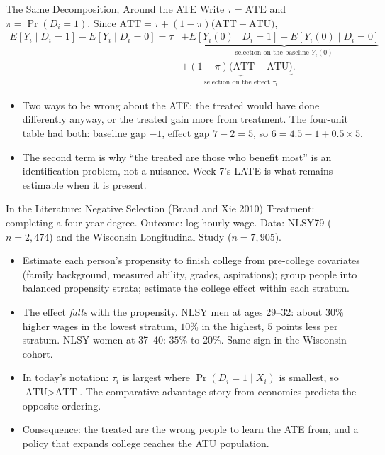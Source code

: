 \documentclass[aspectratio=169,11pt,xcolor=dvipsnames]{beamer}
\newcommand{\srcp}[1]{{\scriptsize\color{gray}(#1)}}
\newcommand{\E}{E}
\begin{document}
\begin{frame}{The Same Decomposition, Around the ATE}
Write $\tau = \text{ATE}$ and $\pi = \Pr(D_i = 1)$. Since
$\text{ATT} = \tau + (1 - \pi)\big(\text{ATT} - \text{ATU}\big)$,
\begin{align*}
  \E[Y_i \mid D_i = 1] - \E[Y_i\mid D_i=0]
 = \tau
  &+ \underbrace{\E[Y_i(0)\mid D_i=1] - \E[Y_i(0)\mid D_i=0]}_{\text{selection on the baseline } Y_i(0)} \\
  &+ \underbrace{(1-\pi)\big(\text{ATT} - \text{ATU}\big)}_{\text{selection on the effect } \tau_i} .
\end{align*}
\begin{itemize}\itemsep3pt
  \item Two ways to be wrong about the ATE: the treated would have done
        differently anyway, or the treated gain more from treatment. The
        four-unit table had both: baseline gap $-1$, effect gap $7 - 2 = 5$,
        so $6 = 4.5 - 1 + 0.5 \times 5$.
  \item The second term is why ``the treated are those who benefit most''
        is an identification problem, not a nuisance. Week 7's LATE is what
        remains estimable when it is present.
\end{itemize}
\end{frame}

\begin{frame}{In the Literature: Negative Selection \srcp{Brand and Xie 2010}}
Treatment: completing a four-year degree. Outcome: log hourly wage. Data:
NLSY79 ($n = 2{,}474$) and the Wisconsin Longitudinal Study ($n = 7{,}905$).
\begin{itemize}\itemsep3pt
  \item Estimate each person's propensity to finish college from pre-college
        covariates (family background, measured ability, grades, aspirations);
        group people into balanced propensity strata; estimate the college
        effect within each stratum.
  \item The effect \emph{falls} with the propensity. NLSY men at ages 29--32:
        about $30\%$ higher wages in the lowest stratum, $10\%$ in the
        highest, $5$ points less per stratum. NLSY women at 37--40: $35\%$
        to $20\%$. Same sign in the Wisconsin cohort.
  \item In today's notation: $\tau_i$ is largest where $\Pr(D_i = 1 \mid X_i)$
        is smallest, so $\text{ATU} > \text{ATT}$. The comparative-advantage
        story from economics predicts the opposite ordering.
  \item Consequence: the treated are the wrong people to learn the ATE from,
        and a policy that expands college reaches the ATU population.
\end{itemize}
\end{frame}
\end{document}
